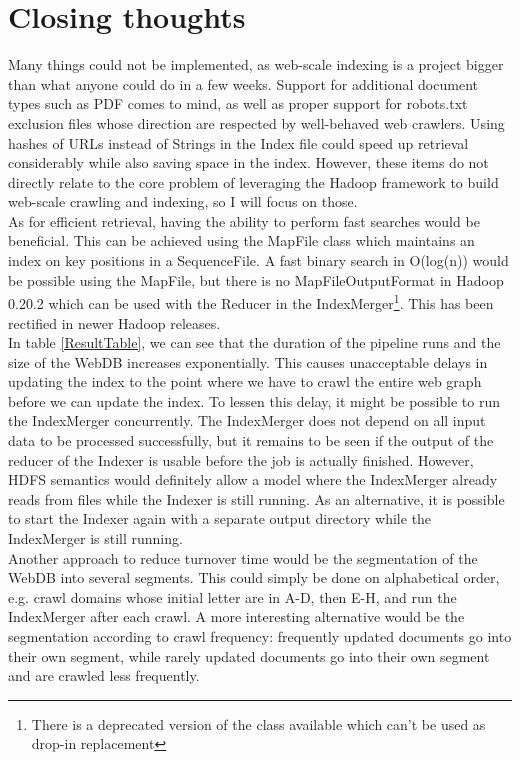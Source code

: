 \documentclass[12pt,a4paper]{report}
\begin{document}
\section{Closing thoughts}
Many things could not be implemented, as web-scale indexing is a project bigger than what anyone could do in a few weeks. Support for additional document types
such as PDF comes to mind, as well as proper support for robots.txt exclusion files whose direction are respected by well-behaved web crawlers. Using hashes of URLs instead of Strings in the Index file could speed up retrieval considerably while also saving space in the index. However,
these items do not directly relate to the core problem of leveraging the Hadoop framework to build web-scale crawling and indexing, so I will focus on those.
\\
As for efficient retrieval, having the ability to perform fast searches would be beneficial. This can be achieved using the MapFile class which maintains an index on
key positions in a SequenceFile. A fast binary search in O(log(n)) would be possible using the MapFile, but there is no MapFileOutputFormat in Hadoop 0.20.2 which can be used with the Reducer in the IndexMerger\footnote{There is a deprecated version of the class available which can't be used as drop-in replacement}. This has been rectified in newer Hadoop releases.
\\
In table \ref{ResultTable}, we can see that the duration of the pipeline runs and the size of the WebDB increases exponentially. This causes unacceptable delays in updating the index to the point where we have to crawl the entire web graph before we can update the index. To lessen this delay, it might be possible to run the IndexMerger concurrently. The IndexMerger does not depend on all input data to be processed successfully, but it remains to be seen if the output of
the reducer of the Indexer is usable before the job is actually finished. However, HDFS semantics would definitely allow a model where the IndexMerger already reads from files while
the Indexer is still running. As an alternative, it is possible to start the Indexer again with a separate output directory while the IndexMerger is still running.
\\
Another approach to reduce turnover time would be the segmentation of the WebDB into several segments. This could simply be done on alphabetical order, e.g.
crawl domains whose initial letter are in A-D, then E-H, and run the IndexMerger after each crawl.
A more interesting alternative would be the segmentation according to crawl frequency: frequently updated documents go into their own segment, while rarely updated documents go into their own segment and are crawled less frequently.
\end{document}

